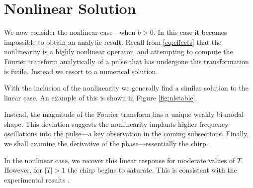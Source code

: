 \documentclass[10pt,twocolumn,a4paper]{article}
\begin{document}
\section{Nonlinear Solution}
We now consider the nonlinear case---when $b > 0$. In this case it becomes impossible to obtain an analytic result. Recall from \eqref{eq:effects} that the nonlinearity is a highly nonlinear operator, and attempting to compute the Fourier transform analytically of a pulse that has undergone this transformation is futile. Instead we resort to a numerical solution.




With the inclusion of the nonlinearity we generally find a similar solution to the linear case. An example of this is shown in Figure \ref{fig:nlstable}.

Instead, the magnitude of the Fourier transform has a unique weakly bi-modal shape. This deviation suggests the nonlinearity implants higher frequency oscillations into the pulse---a key observation in the coming subsections. Finally, we shall examine the derivative of the phase---essentially the chirp.

 In the nonlinear case, we recover this linear response for moderate values of $T$. However, for $|T| > 1$ the chirp begins to saturate. This is consistent with the experimental results \cite{chen, rothenberg, tomlinson}.
\end{document}
